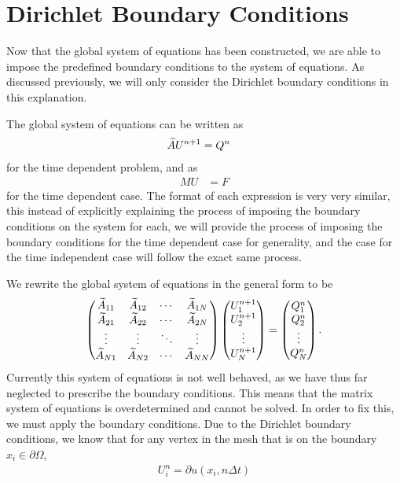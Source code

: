 \documentclass[../fem.tex]{subfile}
\begin{document}
\section{Dirichlet Boundary Conditions}%
\label{sec:dirichlet_boundary_conditions}

Now that the global system of equations has been constructed, we are able to
impose the predefined boundary conditions to the system of equations. As
discussed previously, we will only consider the Dirichlet boundary conditions
in this explanation.

The global system of equations can be written as
\begin{align*}
  \widetilde{A}U^{n+1}&=Q^n
\end{align*}
for the time dependent problem, and as
\begin{align*}
  MU&=F
\end{align*}
for the time dependent case. The format of each expression is very very
similar, this instead of explicitly explaining the process of imposing the
boundary conditions on the system for each, we will provide the process of
imposing the boundary conditions for the time dependent case for generality,
and the case for the time independent case will follow the exact same process.

We rewrite the global system of equations in the general form to be
\begin{align*}
  \begin{pmatrix}
    \widetilde{A}_{11} & \widetilde{A}_{12} & \cdots & \widetilde{A}_{1N}\\
    \widetilde{A}_{21} & \widetilde{A}_{22} & \cdots & \widetilde{A}_{2N}\\
    \vdots & \vdots & \ddots & \vdots \\
    \widetilde{A}_{N1} & \widetilde{A}_{N2} & \cdots & \widetilde{A}_{NN}
  \end{pmatrix}
  \begin{pmatrix}
    U^{n+1}_1 \\
    U^{n+1}_2 \\
    \vdots \\
    U^{n+1}_N \\
  \end{pmatrix}
  =\begin{pmatrix}
    Q^n_1 \\
    Q^n_2 \\
    \vdots \\
    Q^n_N \\
  \end{pmatrix}.
\end{align*}
Currently this system of equations is not well behaved, as we have thus far
neglected to prescribe the boundary conditions. This means that the matrix
system of equations is overdetermined and cannot be solved. In order to fix
this, we must apply the boundary conditions. Due to the Dirichlet boundary
conditions, we know that for any vertex in the mesh that is on the boundary
$x_i\in\partial\Omega$,
\begin{align*}
  U^n_i=\partial u(x_i,n\Delta t)\\
\end{align*}
\end{document}
